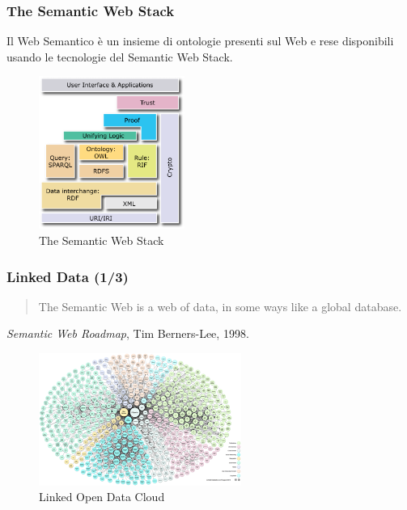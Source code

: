\documentclass[8pt]{beamer}
\begin{document}
\begin{frame}
\frametitle{The Semantic Web Stack}
Il Web Semantico \`e un insieme di ontologie presenti sul Web
e rese disponibili usando le tecnologie del Semantic Web Stack.
 
\begin{figure}
    \includegraphics[width=180px]{Semantic_Web_Stack.png}
    \caption{The Semantic Web Stack} 
\end{figure}

\end{frame}

\begin{frame}
\frametitle{Linked Data (1/3)}
\begin{quote}
The Semantic Web is a web of data, in some ways like a global database.
\end{quote}
\small{\emph{Semantic Web Roadmap}, Tim Berners-Lee, 1998.}
\begin{figure}
    \includegraphics[width=250px]{lod-cloud_colored_1000px.png} 
    \caption{Linked Open Data Cloud}
\end{figure}
\end{frame}
\end{document}

